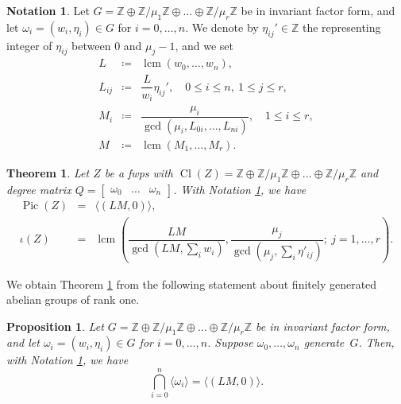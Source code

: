 \documentclass{amsart}
\DeclareMathOperator{\Cl}{Cl}
\DeclareMathOperator{\Pic}{Pic}
\DeclareMathOperator{\lcm}{lcm}
\newcommand{\Z}{\mathbb{Z}}
\newtheorem{proposition}[lem]{Proposition}
\newtheorem{theorem}[lem]{Theorem}
\theoremstyle{definition}
\newtheorem{notation}[lem]{Notation}
\begin{document}
\begin{notation}\label{not}
    Let $G=\Z\oplus \Z/\mu_1\Z\oplus\dots\oplus\Z/\mu_r\Z$ be in invariant factor form, and let $\omega_i=(w_i,\eta_i)\in G$ for $i=0,\dots,n$.
    We denote by $\eta_{ij}'\in\Z$ the representing integer of $\eta_{ij}$ between $0$ and $\mu_j-1$, and we set
    \[
    \begin{array}{lcll}  
    L & \coloneqq & \lcm(w_0,\dots,w_n),
    \\[3pt]
    L_{ij} & \coloneqq & \dfrac{L}{w_i}\eta_{ij}', \quad 0 \le i \le n, \ 1\leq j\leq r,
    \\[3pt]
    M_i & \coloneqq & \dfrac{\mu_i}{\gcd\left(\mu_i,L_{0i},\dots,L_{ni}\right)}, \quad 1 \le i \le r,
    \\[9pt]
    M & \coloneqq & \lcm(M_1,\dots,M_r).
    \end{array}
    \] 
\end{notation}


\begin{theorem} \label{thm:pic_fwps}
    Let $Z$ be a fwps with $\Cl(Z)=\Z\oplus \Z/\mu_1\Z\oplus\dots\oplus\Z/\mu_r\Z$ and  degree matrix $Q=\begin{bmatrix}
        \omega_0 & \dots & \omega_n
    \end{bmatrix}$.
    With Notation \ref{not}, we have
    \vspace{5pt}
    $$
    \begin{array}{lcl}
    \Pic(Z) & = &\langle(LM,0)\rangle,\\[8pt]
    \iota(Z) & = &\lcm\left(\dfrac{LM}{\gcd\left(LM,\sum_{i}w_i\right)},\dfrac{\mu_j}{\gcd\left(\mu_j,\sum_i \eta'_{ij}\right)}; \ j=1,\dots,r\right).
    \end{array}
    $$
\end{theorem}

We obtain Theorem \ref{thm:pic_fwps} from the following statement about finitely generated abelian groups of rank one. 

\begin{proposition} \label{pic_fwps}
    Let $G=\Z\oplus \Z/\mu_1\Z\oplus\dots\oplus\Z/\mu_r\Z$ be in invariant factor form, and let $\omega_i=(w_i,\eta_i)\in G$ for $i=0,\dots,n$. Suppose $\omega_0,\dots,\omega_n$ generate~$G$. Then, with Notation \ref{not}, we have
    $$
    \bigcap_{i=0}^n\langle \omega_i\rangle=\langle(LM,0)\rangle.
    $$
\end{proposition}
\end{document}
